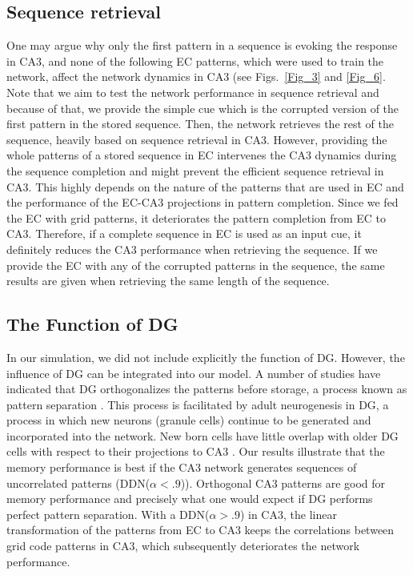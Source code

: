 \documentclass[utf8]{frontiersSCNS} %
\begin{document}
\subsection{Sequence retrieval}
One may argue why only the first pattern in a sequence is evoking the response in CA3, and none of the following EC patterns, which were used to train the network, affect the network dynamics in CA3 (see Figs.~\ref{Fig_3} and \ref{Fig_6}.  
Note that we aim to test the network performance in sequence retrieval and because of that, we provide the simple cue which is the corrupted version of the first pattern in the stored sequence. Then, the network retrieves the rest of the sequence, heavily based on sequence retrieval in CA3. 
However, providing the whole patterns of a stored sequence in EC intervenes the CA3 dynamics during the sequence completion and might prevent the efficient sequence retrieval in CA3. This highly depends on the nature of the patterns that are used in EC and the performance of the EC-CA3 projections in pattern completion. Since we fed the EC with grid patterns, it deteriorates the pattern completion from EC to CA3. Therefore, if a complete sequence in EC is used as an input cue, it definitely reduces the CA3 performance when retrieving the sequence.
%
If we provide the EC with any of the corrupted patterns in the sequence, the same results are given when retrieving the same length of the sequence. 

\subsection{The Function of DG}
 
In our simulation, we did not include explicitly the function of DG. However, the influence of DG can be integrated into our model. A number of studies have indicated that DG orthogonalizes the patterns before storage, a process known as pattern separation \citep{mcnaughton1987hippocampal, o1994hippocampal, marr1991simple, treves2008mammalian}. This process is facilitated by adult neurogenesis in DG, a process in which new neurons (granule cells) continue to be generated and incorporated into the network. New born cells have little overlap with older DG cells with respect to their projections to CA3 \citep{becker2005computational, wiskott2006functional, aimone2009computational}.
%
Our results illustrate that the memory performance is best if the CA3 network generates sequences of uncorrelated patterns (DDN($\alpha < .9$)). Orthogonal CA3 patterns are good for memory performance and precisely what one would expect if DG performs perfect pattern separation.
%
With a DDN($\alpha > .9$) in CA3, the linear transformation of the patterns from EC to CA3 keeps the correlations between grid code patterns in CA3, which subsequently deteriorates the network performance.
% 
\end{document}
